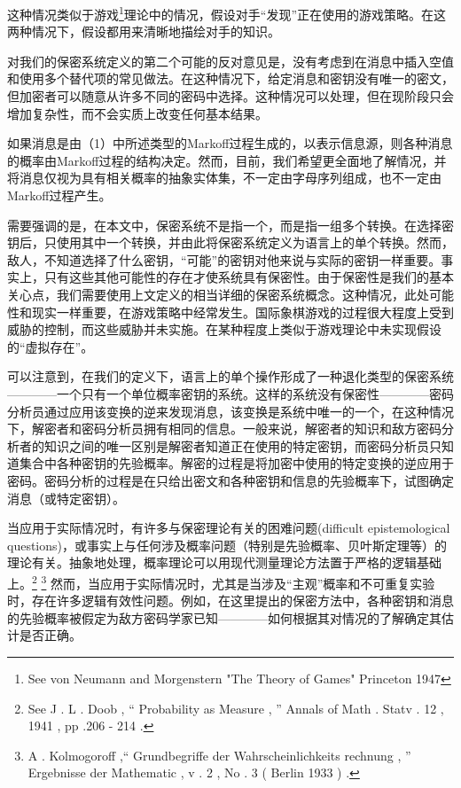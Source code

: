 \documentclass[]{article}
\begin{document}
这种情况类似于游戏\footnote{ See von Neumann and Morgenstern	"The Theory of Games" Princeton 1947}理论中的情况，假设对手“发现”正在使用的游戏策略。在这两种情况下，假设都用来清晰地描绘对手的知识。


对我们的保密系统定义的第二个可能的反对意见是，没有考虑到在消息中插入空值和使用多个替代项的常见做法。在这种情况下，给定消息和密钥没有唯一的密文，但加密者可以随意从许多不同的密码中选择。这种情况可以处理，但在现阶段只会增加复杂性，而不会实质上改变任何基本结果。

如果消息是由（1）中所述类型的Markoff过程生成的，以表示信息源，则各种消息的概率由Markoff过程的结构决定。然而，目前，我们希望更全面地了解情况，并将消息仅视为具有相关概率的抽象实体集，不一定由字母序列组成，也不一定由Markoff过程产生。

需要强调的是，在本文中，保密系统不是指一个，而是指一组多个转换。在选择密钥后，只使用其中一个转换，并由此将保密系统定义为语言上的单个转换。然而，敌人，不知道选择了什么密钥，“可能”的密钥对他来说与实际的密钥一样重要。事实上，只有这些其他可能性的存在才使系统具有保密性。由于保密性是我们的基本关心点，我们需要使用上文定义的相当详细的保密系统概念。这种情况，此处可能性和现实一样重要，在游戏策略中经常发生。国际象棋游戏的过程很大程度上受到威胁的控制，而这些威胁并未实施。在某种程度上类似于游戏理论中未实现假设的“虚拟存在”。

可以注意到，在我们的定义下，语言上的单个操作形成了一种退化类型的保密系统————一个只有一个单位概率密钥的系统。这样的系统没有保密性————密码分析员通过应用该变换的逆来发现消息，该变换是系统中唯一的一个，在这种情况下，解密者和密码分析员拥有相同的信息。一般来说，解密者的知识和敌方密码分析者的知识之间的唯一区别是解密者知道正在使用的特定密钥，而密码分析员只知道集合中各种密钥的先验概率。解密的过程是将加密中使用的特定变换的逆应用于密码。密码分析的过程是在只给出密文和各种密钥和信息的先验概率下，试图确定消息（或特定密钥）。

当应用于实际情况时，有许多与保密理论有关的困难问题(difficult epistemological questions)，或事实上与任何涉及概率问题（特别是先验概率、贝叶斯定理等）的理论有关。抽象地处理，概率理论可以用现代测量理论方法置于严格的逻辑基础上。\footnote{See J . L . Doob , “ Probability as Measure , ” Annals of Math . Statv . 12 , 1941 , pp .206 - 214 .} \footnote{A . Kolmogoroff ,“ Grundbegriffe der Wahrscheinlichkeits rechnung , ” Ergebnisse der Mathematic , v . 2 , No . 3 ( Berlin 1933 ) .}
然而，当应用于实际情况时，尤其是当涉及“主观”概率和不可重复实验时，存在许多逻辑有效性问题。例如，在这里提出的保密方法中，各种密钥和消息的先验概率被假定为敌方密码学家已知————如何根据其对情况的了解确定其估计是否正确。
\end{document}
